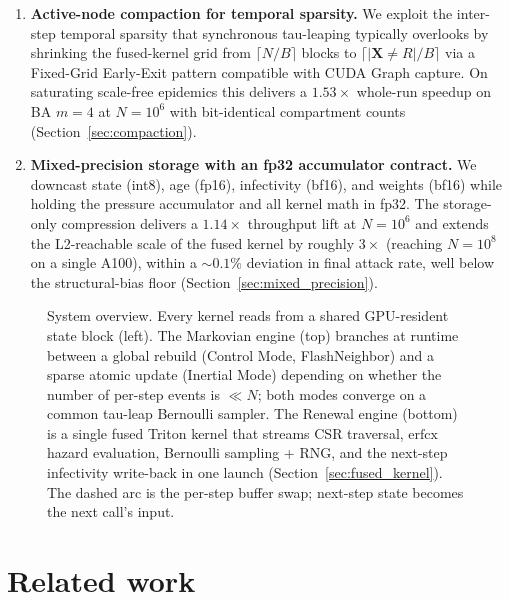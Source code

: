 \begin{enumerate}
    \item \textbf{Active-node compaction for temporal sparsity.} We exploit the inter-step temporal sparsity that synchronous tau-leaping typically overlooks by shrinking the fused-kernel grid from $\lceil N/B \rceil$ blocks to $\lceil |\mathbf{X} {\ne} R| / B \rceil$ via a Fixed-Grid Early-Exit pattern compatible with CUDA Graph capture. On saturating scale-free epidemics this delivers a $\mathbf{1.53\times}$ whole-run speedup on BA $m{=}4$ at $N{=}10^6$ with bit-identical compartment counts (Section~\ref{sec:compaction}).

    \item \textbf{Mixed-precision storage with an fp32 accumulator contract.} We downcast state (int8), age (fp16), infectivity (bf16), and weights (bf16) while holding the pressure accumulator and all kernel math in fp32. The storage-only compression delivers a $1.14\times$ throughput lift at $N = 10^6$ and extends the L2-reachable scale of the fused kernel by roughly $3\times$ (reaching $N = 10^8$ on a single A100), within a $\sim\!0.1\%$ deviation in final attack rate, well below the structural-bias floor (Section~\ref{sec:mixed_precision}).
\end{enumerate}

\begin{figure}[H]
\centering

\caption{System overview. Every kernel reads from a shared GPU-resident state block (left). The Markovian engine (top) branches at runtime between a global rebuild (Control Mode, FlashNeighbor) and a sparse atomic update (Inertial Mode) depending on whether the number of per-step events is $\ll N$; both modes converge on a common tau-leap Bernoulli sampler. The Renewal engine (bottom) is a single fused Triton kernel that streams CSR traversal, $\mathrm{erfcx}$ hazard evaluation, Bernoulli sampling + RNG, and the next-step infectivity write-back in one launch (Section~\ref{sec:fused_kernel}). The dashed arc is the per-step buffer swap; next-step state becomes the next call's input.}
\label{fig:architecture}
\end{figure}

\section{Related work}\label{sec:related}

